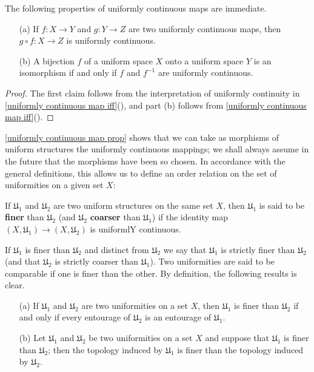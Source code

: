 The following properties of uniformly continuous maps are immediate.
\begin{proposition}\label{uniformly continuous map prop}
\mbox{}
\begin{itemize}
\item[(a)] If $f:X\to Y$ and $g:Y\to Z$ are two uniformly continuous maps, then $g\circ f:X\to Z$ is uniformly continuous.
\item[(b)] A bijection $f$ of a uniform space $X$ onto a uniform space $Y$ is an isomorphism if and only if $f$ and $f^{-1}$ are uniformly continuous.
\end{itemize}
\end{proposition}
\begin{proof}
The first claim follows from the interpretation of uniformly continuity in \cref{uniformly continuous map iff}(), and part (b) follows from \cref{uniformly continuous map iff}().
\end{proof}
\cref{uniformly continuous map prop} shows that we can take as morphisms of uniform structures the uniformly continuous mappings; we shall always assume in the future that the morphisms have been so chosen. In accordance with the general definitions, this allows us to define an order relation on the set of uniformities on a given set $X$:
\begin{definition}
If $\mathfrak{U}_1$ and $\mathfrak{U}_2$ are two uniform structures on the same set $X$, then $\mathfrak{U}_1$ is said to be \textbf{finer} than $\mathfrak{U}_2$ (and $\mathfrak{U}_2$ \textbf{coarser} than $\mathfrak{U}_1$) if the identity map $(X,\mathfrak{U}_1)\to(X,\mathfrak{U}_2)$ is uniformlY continuous.
\end{definition}
If $\mathfrak{U}_1$ is finer than $\mathfrak{U}_2$ and distinct from $\mathfrak{U}_2$ we say that $\mathfrak{U}_1$ is strictly finer than $\mathfrak{U}_2$ (and that $\mathfrak{U}_2$ is strictly coarser than $\mathfrak{U}_1$). Two uniformities are said to be comparable if one is finer than the other. By definition, the following results is clear.
\begin{proposition}\label{uniformity finer iff}
\mbox{}
\begin{itemize}
\item[(a)] If $\mathfrak{U}_1$ and $\mathfrak{U}_2$ are two uniformities on a set $X$, then $\mathfrak{U}_1$ is finer than $\mathfrak{U}_2$ if and only if every entourage of $\mathfrak{U}_2$ is an entourage of $\mathfrak{U}_1$.
\item[(b)] Let $\mathfrak{U}_1$ and $\mathfrak{U}_2$ be two uniformities on a set $X$ and suppose that $\mathfrak{U}_1$ is finer than $\mathfrak{U}_2$; then the topology induced by $\mathfrak{U}_1$ is finer than the topology induced by $\mathfrak{U}_2$.
\end{itemize}
\end{proposition}
